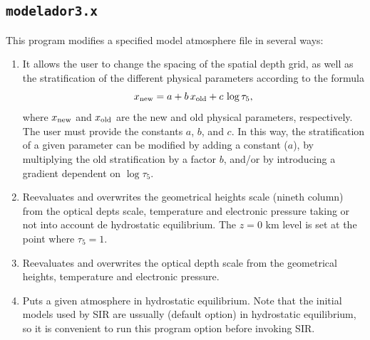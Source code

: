 \subsection{{\tt modelador3.x}}

This program modifies a specified model atmosphere file in several ways: 
\begin{enumerate}

\item
It allows
the user to change the spacing of the spatial depth grid, as well as 
the stratification of the different physical parameters according to
the formula
\begin{displaymath}
x_{\rm new} = a + b \, x_{\rm old} + c \, \log {\tau_5},
\end{displaymath}
where $x_{\rm new}$ and $x_{\rm old}$ are the new and old physical
parameters, respectively. The user must provide the constants $a$, $b$, and
$c$. In this way, the stratification of a given parameter can be modified
by adding a constant ($a$), by multiplying the old stratification by a
factor $b$, and/or by introducing a gradient dependent on $\log \tau_5$.

\item Reevaluates and overwrites the geometrical heights scale (nineth column) from
the optical depts scale, temperature and electronic pressure taking or not into account de hydrostatic equilibrium. The $z=0$ km level is set at the point where
$\tau_5 =1$.

\item Reevaluates and overwrites the optical depth scale from
the geometrical heights, temperature and electronic pressure.

\item Puts a given atmosphere in hydrostatic equilibrium. Note
that the initial models used by SIR are ussually (default option) in hydrostatic equilibrium, so it is convenient to run this program option before invoking SIR. 


\end{enumerate}
